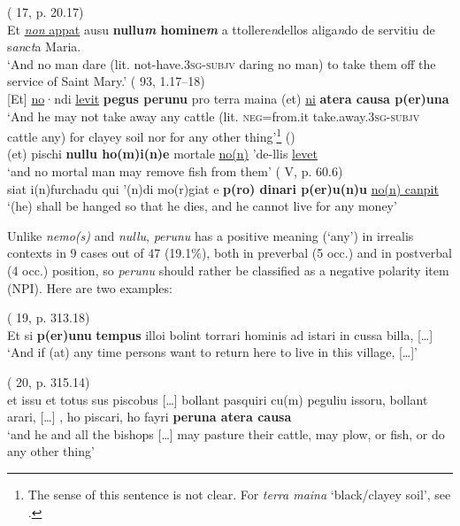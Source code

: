 \documentclass[output=paper,colorlinks,citecolor=brown]{langscibook}
\begin{document}
\ea \label{ex:men8}
    \ea ( 17, p. 20.17)\\
    Et \ul{\textit{non} appat} ausu \textbf{nullu\textit{m} homine\textit{m}} a ttollere\textit{n}dellos aliga\textit{n}do de servitiu de s\textit{an}c\textit{t}a Maria.\\
    ‘And no man dare (lit. not-have.3\textsc{sg-subjv} daring no man) to take them off the service of Saint Mary.’
    \ex ( 93, 1.17--18)\\
    {[Et]} \ul{no}·ndi \ul{levit} \textbf{pegus perunu} pro terra maina (et) \ul{ni} \textbf{atera causa p(er)una}\\
    ‘And he may not take away any cattle (lit. \textsc{neg}=from.it take.away.3\textsc{sg-subjv} cattle any) for clayey soil nor for any other thing’\footnote{The sense of this sentence is not clear. For \textit{terra maina} ‘black/clayey soil’, see \citet[][96, 237]{BlascoFerrer2003}.} 
    \ex () \\
    (et) pischi \textbf{nullu ho(m)i(n)e} mortale \ul{no(n)} 'de-llis \ul{levet}\\
    ‘and no mortal man may remove fish from them’
    \ex ( V, p. 60.6)\\
    siat i(n)furchadu qui '(n)di mo(r)giat e \textbf{p(ro) dinari p(er)u(n)u} \ul{no(n) canpit}\\
    ‘(he) shall be hanged so that he dies, and he cannot live for any money’
\z
\z

Unlike \textit{nemo(s)} and \textit{nullu}, \textit{perunu} has a positive meaning (‘any’) in irrealis contexts in 9 cases out of 47 (19.1\%), both in preverbal (5 occ.) and in postverbal (4 occ.) position, so \textit{perunu} should rather be classified as a negative polarity item (NPI). Here are two examples:

\ea\label{ex:men9}
    \ea ( 19, p. 313.18)\\
    Et si \textbf{p(er)unu} \textbf{tempus} illoi bolint torrari hominis ad istari in cussa billa, […]\\
    ‘And if (at) any time persons want to return here to live in this village, […]’

    \ex ( 20, p. 315.14)\\
    et issu et totus sus piscobus […] bollant pasquiri cu(m) peguliu issoru, bollant arari, […] , ho piscari, ho fayri \textbf{peruna atera causa} \\
    ‘and he and all the bishops […] may pasture their cattle, may plow, or fish, or do any other thing’
\z
\z
\end{document}
